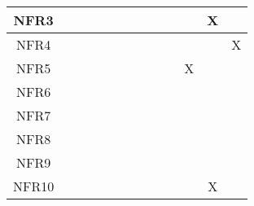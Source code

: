 \documentclass[12pt, titlepage]{article}
\begin{document}
\begin{table}[H]
\begin{tabular}{|c|cccccccccccc|}
NFR3 & \multicolumn{1}{c|}{}  & \multicolumn{1}{c|}{}  & \multicolumn{1}{c|}{}
& \multicolumn{1}{c|}{}  & \multicolumn{1}{c|}{}  & \multicolumn{1}{c|}{}
& \multicolumn{1}{c|}{}  & \multicolumn{1}{c|}{}  & \multicolumn{1}{c|}{}
& \multicolumn{1}{c|}{}   & \multicolumn{1}{c|}{X}   &    \\ \hline

NFR4 & \multicolumn{1}{c|}{}  & \multicolumn{1}{c|}{}  & \multicolumn{1}{c|}{}
& \multicolumn{1}{c|}{}  & \multicolumn{1}{c|}{}  & \multicolumn{1}{c|}{}
& \multicolumn{1}{c|}{}  & \multicolumn{1}{c|}{}  & \multicolumn{1}{c|}{}
& \multicolumn{1}{c|}{}   & \multicolumn{1}{c|}{}   &  X  \\ \hline

NFR5 & \multicolumn{1}{c|}{}  & \multicolumn{1}{c|}{}  & \multicolumn{1}{c|}{}
& \multicolumn{1}{c|}{}  & \multicolumn{1}{c|}{}  & \multicolumn{1}{c|}{}
& \multicolumn{1}{c|}{}  & \multicolumn{1}{c|}{}  & \multicolumn{1}{c|}{}
& \multicolumn{1}{c|}{X}   & \multicolumn{1}{c|}{}   &    \\ \hline

NFR6 & \multicolumn{1}{c|}{}  & \multicolumn{1}{c|}{}  & \multicolumn{1}{c|}{}
& \multicolumn{1}{c|}{}  & \multicolumn{1}{c|}{}  & \multicolumn{1}{c|}{}
& \multicolumn{1}{c|}{}  & \multicolumn{1}{c|}{}  & \multicolumn{1}{c|}{}
& \multicolumn{1}{c|}{}   & \multicolumn{1}{c|}{}   &    \\ \hline

NFR7 & \multicolumn{1}{c|}{}  & \multicolumn{1}{c|}{}  & \multicolumn{1}{c|}{}
& \multicolumn{1}{c|}{}  & \multicolumn{1}{c|}{}  & \multicolumn{1}{c|}{}
& \multicolumn{1}{c|}{}  & \multicolumn{1}{c|}{}  & \multicolumn{1}{c|}{}
& \multicolumn{1}{c|}{}   & \multicolumn{1}{c|}{}   &    \\ \hline

NFR8 & \multicolumn{1}{c|}{}  & \multicolumn{1}{c|}{}  & \multicolumn{1}{c|}{}
& \multicolumn{1}{c|}{}  & \multicolumn{1}{c|}{}  & \multicolumn{1}{c|}{}
& \multicolumn{1}{c|}{}  & \multicolumn{1}{c|}{}  & \multicolumn{1}{c|}{}
& \multicolumn{1}{c|}{}   & \multicolumn{1}{c|}{}   &    \\ \hline

NFR9 & \multicolumn{1}{c|}{}  & \multicolumn{1}{c|}{}  & \multicolumn{1}{c|}{}
& \multicolumn{1}{c|}{}  & \multicolumn{1}{c|}{}  & \multicolumn{1}{c|}{}
& \multicolumn{1}{c|}{}  & \multicolumn{1}{c|}{}  & \multicolumn{1}{c|}{}
& \multicolumn{1}{c|}{}   & \multicolumn{1}{c|}{}   &    \\ \hline

NFR10 & \multicolumn{1}{c|}{}  & \multicolumn{1}{c|}{}  & \multicolumn{1}{c|}{}
& \multicolumn{1}{c|}{}  & \multicolumn{1}{c|}{}  & \multicolumn{1}{c|}{}
& \multicolumn{1}{c|}{}  & \multicolumn{1}{c|}{}  & \multicolumn{1}{c|}{}
& \multicolumn{1}{c|}{}   & \multicolumn{1}{c|}{X}   &    \\ \hline
    \end{tabular}
    \label{tab:traceability}
\end{table}
\end{document}
